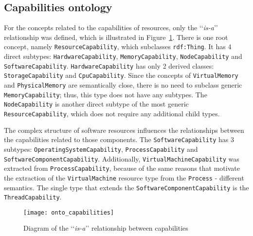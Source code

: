 \pagebreak

\subsection{Capabilities ontology}
\label{subsec:arch_knowledge_capabilitie}

For the concepts related to the capabilities of resources, only the \lq\lq{}\emph{is-a}\rq\rq{} relationship was defined, which is illustrated in Figure~\ref{fig:onto_capabilities}. There is one root concept, namely \texttt{ResourceCapability}, which subclasses \texttt{rdf:Thing}. It has 4 direct subtypes: \texttt{HardwareCapability}, \texttt{MemoryCapability}, \texttt{NodeCapability} and \texttt{SoftwareCapability}. \texttt{HardwareCapability} has only 2 derived classes: \texttt{StorageCapability} and \texttt{CpuCapability}. Since the concepts of \texttt{VirtualMemory} and \texttt{PhysicalMemory} are semantically close, there is no need to subclass generic \texttt{MemoryCapability}; thus, this type does not have any subtypes. The \texttt{NodeCapability} is another direct subtype of the most generic \texttt{ResourceCapability}, which does not require any additional child types.

The complex structure of software resources influences the relationships between the capabilities related to those components. The \texttt{SoftwareCapability} has 3 subtypes: \texttt{OperatingSystemCapability}, \texttt{ProcessCapability} and \texttt{SoftwareComponentCapability}. Additionally, \texttt{VirtualMachineCapability} was extracted from \texttt{ProcessCapability}, because of the same reasons that motivate the extraction of the \texttt{VirtualMachine} resource type from the \texttt{Process} - different semantics. The single type that extends the \texttt{SoftwareComponentCapability} is the \texttt{ThreadCapability}.

\begin{figure}[ht]
\centering
\texttt{[image: onto\_capabilities]}
\caption{Diagram of the \lq\lq{}\emph{is-a}\rq\rq{} relationship between capabilities}
\label{fig:onto_capabilities}
\end{figure}

